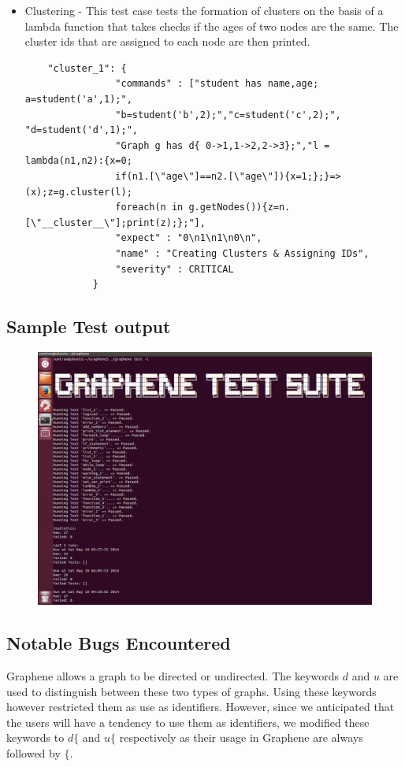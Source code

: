 \documentclass[a4paper]{article}
\begin{document}
\begin{itemize}
\item Clustering - This test case tests the formation of clusters on the basis of a lambda function that takes checks if the ages of two nodes are the same. The cluster ids that are assigned to each node are then printed.
\begin{verbatim}
	"cluster_1": { 
                "commands" : ["student has name,age; a=student('a',1);",
                "b=student('b',2);","c=student('c',2);", "d=student('d',1);",
                "Graph g has d{ 0->1,1->2,2->3};","l = lambda(n1,n2):{x=0;
                if(n1.[\"age\"]==n2.[\"age\"]){x=1;};}=>(x);z=g.cluster(l);
                foreach(n in g.getNodes()){z=n.[\"__cluster__\"];print(z);};"],
                "expect" : "0\n1\n1\n0\n",
                "name" : "Creating Clusters & Assigning IDs",
                "severity" : CRITICAL
            }
\end{verbatim}

\end{itemize}


\subsection{Sample Test output}
\begin{figure}[h]
\centering
\includegraphics[width=1.2\textwidth]{Tests.png}
\end{figure}

\subsection{Notable Bugs Encountered}
Graphene allows a graph to be directed or undirected. The keywords $d$ and $u$ are used to distinguish between these two types of graphs. Using these keywords however restricted them as use as identifiers. However, since we anticipated that the users will have a tendency to use them as identifiers, we modified these keywords to $d\{$ and $u\{$ respectively as their usage in Graphene are always followed by $\{$.\\
\end{document}
